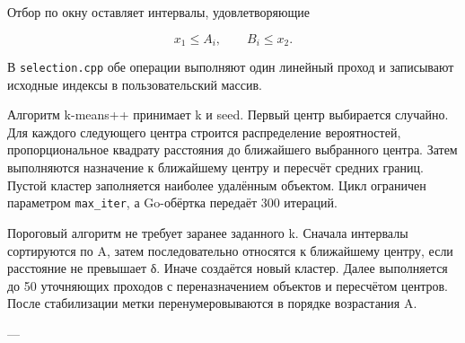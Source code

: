 Отбор по окну оставляет интервалы, удовлетворяющие

\begin{equation}
x_1\leq A_i,\qquad B_i\leq x_2.
\end{equation}

В \texttt{selection.cpp} обе операции выполняют один линейный проход и записывают исходные индексы в пользовательский массив.

Алгоритм k-means++ принимает k и seed. Первый центр выбирается случайно. Для каждого следующего центра строится распределение вероятностей, пропорциональное квадрату расстояния до ближайшего выбранного центра. Затем выполняются назначение к ближайшему центру и пересчёт средних границ. Пустой кластер заполняется наиболее удалённым объектом. Цикл ограничен параметром \texttt{max\_iter}, а Go-обёртка передаёт 300 итераций.

Пороговый алгоритм не требует заранее заданного k. Сначала интервалы сортируются по A, затем последовательно относятся к ближайшему центру, если расстояние не превышает δ. Иначе создаётся новый кластер. Далее выполняется до 50 уточняющих проходов с переназначением объектов и пересчётом центров. После стабилизации метки перенумеровываются в порядке возрастания A.

---
